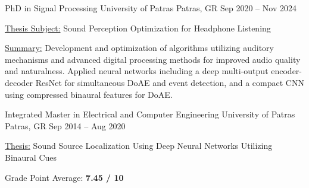 

\begin{cventries}

  \cventry
    {PhD in Signal Processing} %
    {University of Patras} %
    {Patras, GR} %
    {Sep 2020 -- Nov 2024} %
    {
      \begin{cvitems} %
        \item {\underline{Thesis Subject:} Sound Perception Optimization for Headphone Listening}
        \item {\underline{Summary:} Development and optimization of algorithms utilizing auditory mechanisms and advanced digital processing methods for improved audio quality and naturalness. Applied neural networks including a deep multi-output encoder-decoder ResNet for simultaneous DoAE and event detection, and a compact CNN using compressed binaural features for DoAE.}
      \end{cvitems}
    }

  \cventry
    {Integrated Master in Electrical and Computer Engineering} %
    {University of Patras} %
    {Patras, GR} %
    {Sep 2014 -- Aug 2020} %
    {
      \begin{cvitems} %
        \item {\underline{Thesis:} Sound Source Localization Using Deep Neural Networks Utilizing Binaural Cues}
        \item {Grade Point Average: \textbf{7.45 / 10}}
      \end{cvitems}
    }

\end{cventries}
